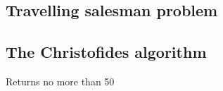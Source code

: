 
\subsection{Travelling salesman problem}

\subsection{The Christofides algorithm}

Returns no more than 50%


